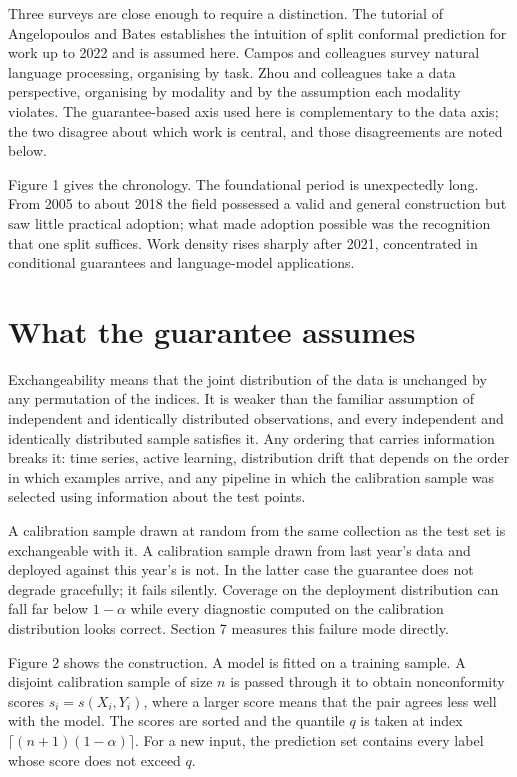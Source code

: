 Three surveys are close enough to require a distinction. The tutorial of
Angelopoulos and Bates \cite{Angelopoulos2021intro} establishes the intuition of
split conformal prediction for work up to 2022 and is assumed here. Campos and
colleagues \cite{Campos2024} survey natural language processing, organising by
task. Zhou and colleagues \cite{Zhou2025} take a data perspective, organising by
modality and by the assumption each modality violates. The guarantee-based axis
used here is complementary to the data axis; the two disagree about which work is
central, and those disagreements are noted below.

Figure 1 gives the chronology. The foundational period is unexpectedly long. From
2005 to about 2018 the field possessed a valid and general construction but saw
little practical adoption; what made adoption possible was the recognition that
one split suffices. Work density rises sharply after 2021, concentrated in
conditional guarantees and language-model applications.

\section{What the guarantee assumes}

Exchangeability means that the joint distribution of the data is unchanged by any
permutation of the indices. It is weaker than the familiar assumption of
independent and identically distributed observations, and every independent and
identically distributed sample satisfies it. Any ordering that carries information
breaks it: time series, active learning, distribution drift that depends on the
order in which examples arrive, and any pipeline in which the calibration sample
was selected using information about the test points.

A calibration sample drawn at random from the same collection as the test set is
exchangeable with it. A calibration sample drawn from last year's data and deployed
against this year's is not. In the latter case the guarantee does not degrade
gracefully; it fails silently. Coverage on the deployment distribution can fall far
below $1-\alpha$ while every diagnostic computed on the calibration distribution
looks correct. Section 7 measures this failure mode directly.

Figure 2 shows the construction. A model is fitted on a training sample. A disjoint
calibration sample of size $n$ is passed through it to obtain nonconformity scores
$s_i=s(X_i,Y_i)$, where a larger score means that the pair agrees less well with
the model. The scores are sorted and the quantile $q$ is taken at index
$\lceil (n+1)(1-\alpha)\rceil$. For a new input, the prediction set contains every
label whose score does not exceed $q$.

